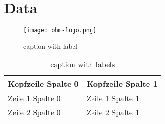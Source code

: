 \chapter{Data}\label{ch:data}

\Blindtext

\begin{figure}
	\centering
	\texttt{[image: ohm-logo.png]}\\
	\caption[shortname in list of figures]{caption with label \label{fig: CloudStack}}
\end{figure}

\begin{table}[h]
	\centering
	\begin{tabular}{|C{5cm}|C{8cm}|}
		\hline 
		\textbf{Kopfzeile Spalte 0} & \textbf{Kopfzeile Spalte 1} \\ 
		\hline 
		Zeile 1 Spalte 0 & Zeile 1 Spalte 1 \\
		\hline
		Zeile 2 Spalte 0 & Zeile 2 Spalte 1 \\
		\hline
	\end{tabular}
	\caption[shortname in list of tabels]{\centering caption with labels \label{tab: Erfuellung}}
\end{table}